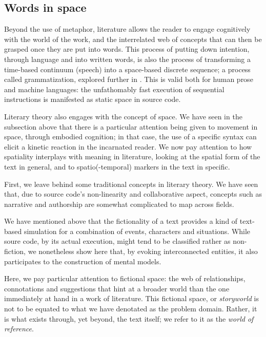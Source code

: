 \subsection{Words in space}
\label{subsec:spatial-literature}

Beyond the use of metaphor, literature allows the reader to engage cognitively with the world of the work, and the interrelated web of concepts that can then be grasped once they are put into words. This process of putting down intention, through language and into written words, is also the process of transforming a time-based continuum (speech) into a space-based discrete sequence; a process called grammatization, explored further in \citep{bouchardon_valeur_2014}. This is valid both for human prose and machine languages: the unfathomably fast execution of sequential instructions is manifested as static space in source code.

Literary theory also engages with the concept of space. We have seen in the subsection above that there is a particular attention being given to movement in space, through embodied cognition; in that case, the use of a specific syntax can elicit a kinetic reaction in the incarnated reader. We now pay attention to how spatiality interplays with meaning in literature, looking at the spatial form of the text in general, and to spatio(-temporal) markers in the text in specific.

First, we leave behind some traditional concepts in literary theory. We have seen that, due to source code's non-linearity and collaborative aspect, concepts such as narrative and authorship are somewhat complicated to map across fields.

We have mentioned above that the fictionality of a text provides a kind of text-based simulation for a combination of events, characters and situations. While soure code, by its actual execution, might tend to be classified rather as non-fiction, we nonetheless show here that, by evoking interconnected entities, it also participates to the construction of mental models.

Here, we pay particular attention to fictional space: the web of relationships, connotations and suggestions that hint at a broader world than the one immediately at hand in a work of literature. This fictional space, or \emph{storyworld} is not to be equated to what we have denotated as the problem domain. Rather, it is what exists through, yet beyond, the text itself; we refer to it as the \emph{world of reference}.

